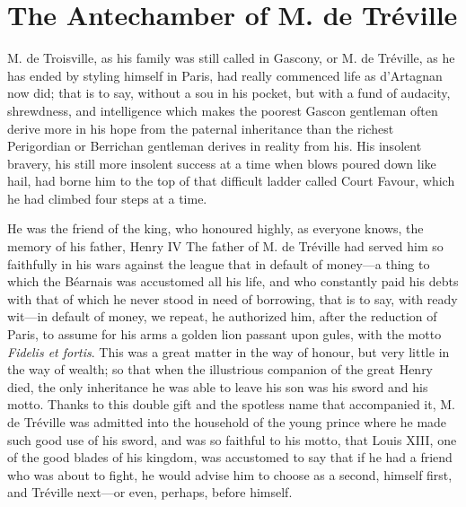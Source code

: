 
\chapter{The Antechamber of M. de Tréville} 
	
	\lettrine[]{M}{.} de Troisville, as his family was still called in Gascony, or M. de Tréville, as he has ended by styling himself in Paris, had really commenced life as d'Artagnan now did; that is to say, without a sou in his pocket, but with a fund of audacity, shrewdness, and intelligence which makes the poorest Gascon gentleman often derive more in his hope from the paternal inheritance than the richest Perigordian or Berrichan gentleman derives in reality from his. His insolent bravery, his still more insolent success at a time when blows poured down like hail, had borne him to the top of that difficult ladder called Court Favour, which he had climbed four steps at a time. 

He was the friend of the king, who honoured highly, as everyone knows, the memory of his father, Henry IV The father of M. de Tréville had served him so faithfully in his wars against the league that in default of money---a thing to which the Béarnais was accustomed all his life, and who constantly paid his debts with that of which he never stood in need of borrowing, that is to say, with ready wit---in default of money, we repeat, he authorized him, after the reduction of Paris, to assume for his arms a golden lion passant upon gules, with the motto \textit{Fidelis et fortis}. This was a great matter in the way of honour, but very little in the way of wealth; so that when the illustrious companion of the great Henry died, the only inheritance he was able to leave his son was his sword and his motto. Thanks to this double gift and the spotless name that accompanied it, M. de Tréville was admitted into the household of the young prince where he made such good use of his sword, and was so faithful to his motto, that Louis XIII, one of the good blades of his kingdom, was accustomed to say that if he had a friend who was about to fight, he would advise him to choose as a second, himself first, and Tréville next---or even, perhaps, before himself. 

